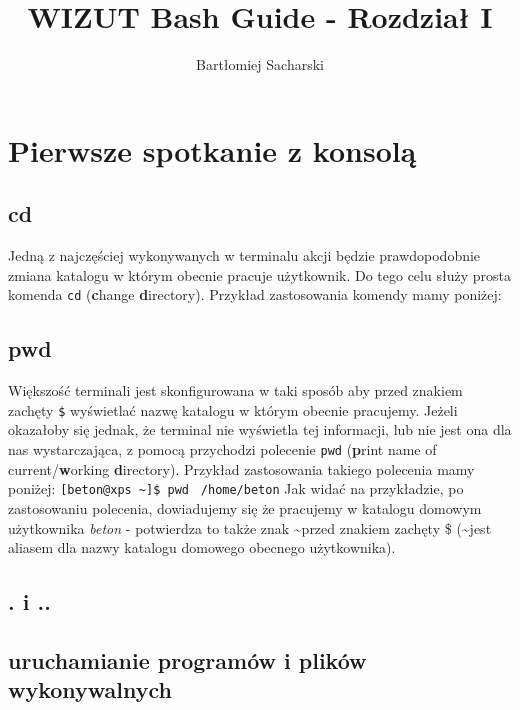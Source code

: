 \documentclass[10 pt, a4paper, draft]{article}
\author{Bartłomiej Sacharski}
\title{WIZUT Bash Guide - Rozdział I}
\begin{document}
\maketitle
\tableofcontents
\newpage

\section{Pierwsze spotkanie z konsolą}
\subsection{cd}
Jedną z najczęściej wykonywanych w terminalu akcji będzie prawdopodobnie zmiana katalogu w którym obecnie pracuje użytkownik. Do tego celu służy prosta komenda \texttt{cd} (\textbf{c}hange \textbf{d}irectory). Przykład zastosowania komendy mamy poniżej:
\newline
\subsection{pwd}
Większość terminali jest skonfigurowana w taki sposób aby przed znakiem zachęty \texttt{\$} wyświetlać nazwę katalogu w którym obecnie pracujemy. Jeżeli okazałoby się jednak, że terminal nie wyświetla tej informacji, lub nie jest ona dla nas wystarczająca, z pomocą przychodzi polecenie \texttt{pwd} (\textbf{p}rint name of current/\textbf{w}orking \textbf{d}irectory). Przykład zastosowania takiego polecenia mamy poniżej:
\newline
\texttt{[beton@xps \textasciitilde]\$ pwd } \newline %
\texttt{/home/beton} \newline 
Jak widać na przykładzie, po zastosowaniu polecenia, dowiadujemy się że pracujemy w katalogu domowym użytkownika \textit{beton} - potwierdza to także znak \textasciitilde przed znakiem zachęty \$ (\textasciitilde jest aliasem dla nazwy katalogu domowego obecnego użytkownika).

\subsection{. i ..}

\subsection{uruchamianie programów i plików wykonywalnych}
\end{document}
